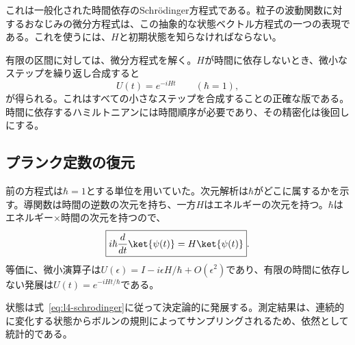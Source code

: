 これは一般化された時間依存のSchr\"odinger方程式である。粒子の波動関数に対するおなじみの微分方程式は、この抽象的な状態ベクトル方程式の一つの表現である。これを使うには、\(H\)と初期状態を知らなければならない。

有限の区間に対しては、微分方程式を解く。\(H\)が時間に依存しないとき、微小なステップを繰り返し合成すると
\begin{equation}
U(t)=e^{-iHt}
\qquad(\hbar=1),
\end{equation}
が得られる。これはすべての小さなステップを合成することの正確な版である。時間に依存するハミルトニアンには時間順序が必要であり、その精密化は後回しにする。

\begin{classroomqa}
\end{classroomqa}

\subsection{プランク定数の復元}

前の方程式は\(\hbar=1\)とする単位を用いていた。次元解析は\(\hbar\)がどこに属するかを示す。導関数は時間の逆数の次元を持ち、一方\(H\)はエネルギーの次元を持つ。\(\hbar\)はエネルギー×時間の次元を持つので、
\begin{equation}
\boxed{i\hbar\frac{d}{dt}\ket{\psi(t)}=H\ket{\psi(t)}}.
\label{eq:l4-schrodinger}
\end{equation}
等価に、微小演算子は\(U(\epsilon)=I-i\epsilon H/\hbar+O(\epsilon^2)\)であり、有限の時間に依存しない発展は\(U(t)=e^{-iHt/\hbar}\)である。

\begin{classroomqa}
\end{classroomqa}

状態は式~\eqref{eq:l4-schrodinger}に従って決定論的に発展する。測定結果は、連続的に変化する状態からボルンの規則によってサンプリングされるため、依然として統計的である。

